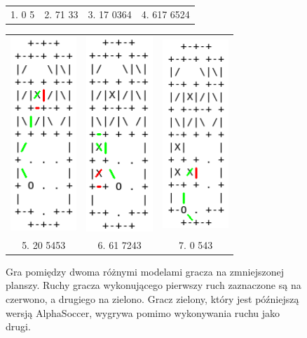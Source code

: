 \documentclass[licencjacka]{pracamgr}
\begin{document}
\begin{figure}
\begin{tabular}{cccc}
  1. 0 5 & 2. 71 33 & 3. 17 0364 & 4. 617 6524 \\[6pt]
\end{tabular}
\begin{tabular}{ccc}
  \includegraphics[width=25mm]{small4} & \includegraphics[width=25mm]{small5} &
  \includegraphics[width=25mm]{small6} \\
  5. 20 5453 & 6. 61 7243 & 7. 0 543
\end{tabular}
\caption{Gra pomiędzy dwoma różnymi modelami gracza na zmniejszonej planszy. Ruchy gracza wykonującego pierwszy ruch zaznaczone są na czerwono, a drugiego na zielono. Gracz zielony, który jest późniejszą wersją AlphaSoccer, wygrywa pomimo wykonywania ruchu jako drugi. }
\end{figure}
\end{document}
